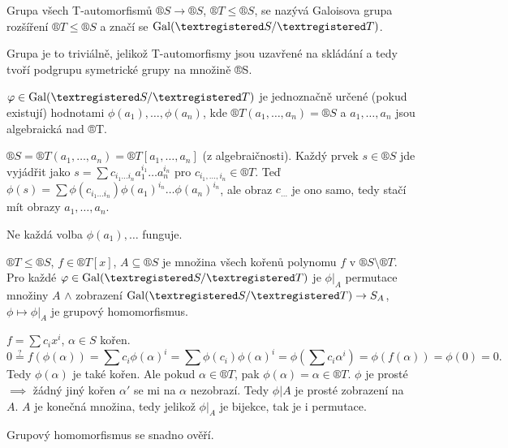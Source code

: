 \documentclass[12pt]{article}                   %
\begin{document}
        \begin{definice}
            Grupa všech T-automorfismů $®S \rightarrow ®S$, $®T ≤ ®S$, se nazývá Galoisova grupa rozšíření $®T ≤ ®S$ a značí se $\Gal(®S / ®T)$.

            \begin{dukazin}
                Grupa je to triviálně, jelikož T-automorfismy jsou uzavřené na skládání a tedy tvoří podgrupu symetrické grupy na množině ®S.
            \end{dukazin}
        \end{definice}

        \begin{pozorovani}
            $\phi \in \Gal(®S / ®T)$ je jednoznačně určené (pokud existují) hodnotami $\phi(a_1), …, \phi(a_n)$, kde $®T(a_1, …, a_n) = ®S$ a $a_1, …, a_n$ jsou algebraická nad ®T.

            \begin{dukazin}
                $®S = ®T(a_1, …, a_n) = ®T[a_1, …, a_n]$ (z algebraičnosti). Každý prvek $s \in ®S$ jde vyjádřit jako $s = \sum c_{i_1…i_n}a_1^{i_1} … a_n^{i_n}$ pro $c_{i_1, …, i_n} \in ®T$. Teď $\phi(s) = \sum\phi(c_{i_1…i_n}) \phi(a_1)^{i_n}…\phi(a_n)^{i_n}$, ale obraz $c_{…}$ je ono samo, tedy stačí mít obrazy $a_1, …, a_n$.
            \end{dukazin}
        \end{pozorovani}

        \begin{upozorneni}
            Ne každá volba $\phi(a_1), …$ funguje.
        \end{upozorneni}

        \begin{tvrzeni}
            $®T ≤ ®S$, $f \in ®T[x]$, $A \subseteq ®S$ je množina všech kořenů polynomu $f$ v $®S \setminus ®T$. Pro každé $\phi \in \Gal(®S/®T)$ je $\phi|_A$ permutace množiny $A$ $\land$ zobrazení $\Gal(®S / ®T) \rightarrow S_A$, $\phi \mapsto \phi|_A$ je grupový homomorfismus.


            \begin{dukazin}
                $f = \sum c_ix^i$, $\alpha \in S$ kořen. 
                $$ 0 \overset{?}{=} f(\phi(\alpha)) = \sum c_i \phi(\alpha)^i = \sum \phi(c_i)\phi(\alpha)^i = \phi(\sum c_i \alpha^i) = \phi(f(\alpha)) = \phi(0) = 0. $$
            Tedy $\phi(\alpha)$ je také kořen. Ale pokud $\alpha \in ®T$, pak $\phi(\alpha) = \alpha \in ®T$. $\phi$ je prosté $\implies$ žádný jiný kořen $\alpha'$ se mi na $\alpha$ nezobrazí. Tedy $\phi | A$ je prosté zobrazení na $A$. $A$ je konečná množina, tedy jelikož $\phi|_A$ je bijekce, tak je i permutace.

                Grupový homomorfismus se snadno ověří.
            \end{dukazin}
        \end{tvrzeni}
\end{document}
